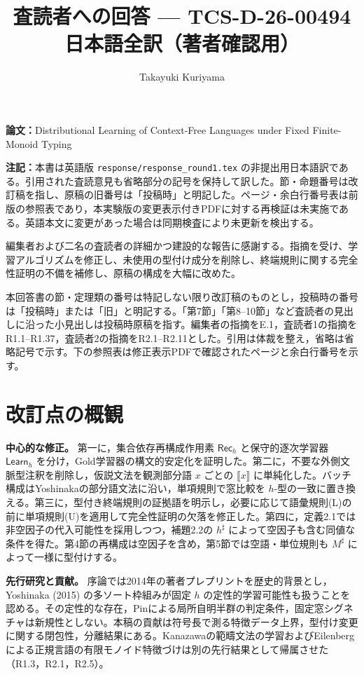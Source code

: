 \documentclass[10pt,a4paper]{ltjsarticle}
\title{査読者への回答 --- TCS-D-26-00494\\\large 日本語全訳（著者確認用）}
\author{Takayuki Kuriyama}
\date{}
\newcommand{\NT}[1]{\llbracket #1\rrbracket}
\newcommand{\Bh}{\mathsf{Rec}_h}
\newcommand{\Ah}{\mathsf{Learn}_h}
\begin{document}
\maketitle
\noindent\textbf{論文：}Distributional Learning of Context-Free Languages under Fixed Finite-Monoid Typing

\noindent\textbf{注記：}本書は英語版 \texttt{response/response\_round1.tex} の非提出用日本語訳である。引用された査読意見も省略部分の記号を保持して訳した。節・命題番号は改訂稿を指し、原稿の旧番号は「投稿時」と明記した。ページ・余白行番号表は前版の参照表であり，本実験版の変更表示付きPDFに対する再検証は未実施である。英語本文に変更があった場合は同期検査により未更新を検出する。



編集者および二名の査読者の詳細かつ建設的な報告に感謝する。指摘を受け、学習アルゴリズムを修正し、未使用の型付け成分を削除し、終端規則に関する完全性証明の不備を補修し、原稿の構成を大幅に改めた。

本回答書の節・定理類の番号は特記しない限り改訂稿のものとし，投稿時の番号は「投稿時」または「旧」と明記する。「第7節」「第8--10節」など査読者の見出しに沿った小見出しは投稿時原稿を指す。編集者の指摘をE.1，査読者1の指摘をR1.1--R1.37，査読者2の指摘をR2.1--R2.11とした。引用は体裁を整え，省略は省略記号で示す。下の参照表は修正表示PDFで確認されたページと余白行番号を示す。

\section*{改訂点の概観}
\noindent\textbf{中心的な修正。}
第一に，集合依存再構成作用素 $\Bh$ と保守的逐次学習器 $\Ah$ を分け，Gold学習器の構文的安定化を証明した。第二に，不要な外側文脈型注釈を削除し，仮説文法を観測部分語 $x$ ごとの $\NT{x}$ に単純化した。バッチ構成はYoshinakaの部分語文法に沿い，単項規則で窓比較を $h$-型の一致に置き換える。第三に，型付き終端規則の証拠語を明示し，必要に応じて語彙規則(L)の前に単項規則(U)を適用して完全性証明の欠落を修正した。第四に，定義2.1では非空因子の代入可能性を採用しつつ，補題2.2の $h^\sharp$ によって空因子も含む同値な条件を得た。第4節の再構成は空因子を含め，第5節では空語・単位規則も $M^\sharp$ によって一様に型付けする。

\noindent\textbf{先行研究と貢献。}
序論では2014年の著者プレプリントを歴史的背景とし，Yoshinaka (2015) の多ソート枠組みが固定 $h$ の定性的学習可能性も扱うことを認める。その定性的な存在，Pinによる局所自明半群の判定条件，固定窓シグネチャは新規性としない。本稿の貢献は符号長で測る特徴データ上界，型付け変更に関する閉包性，分離結果にある。Kanazawaの範疇文法の学習およびEilenbergによる正規言語の有限モノイド特徴づけは別の先行結果として帰属させた（R1.3，R2.1，R2.5）。
\end{document}

